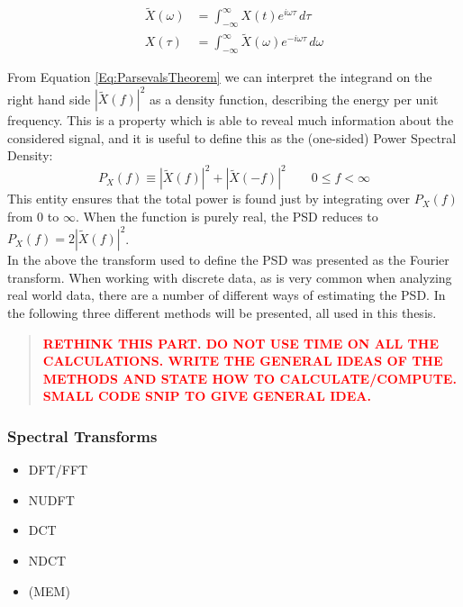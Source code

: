 \documentclass[../../CompleteThesis2/Complete_2ndDraft]{subfiles}
\begin{document}
\begin{equation}
	\begin{aligned}
		\tilde{X}(\omega) &= \int_{-\infty}^{\infty} X(t) e^{i\omega\tau}\, d\tau \\
		X(\tau) &= \int_{-\infty}^{\infty} \tilde{X}(\omega) e^{-i\omega\tau}\, d\omega
		\label{Eq:FourierTransformAngular}
	\end{aligned} 
\end{equation}

From Equation \ref{Eq:ParsevalsTheorem} we can interpret the integrand on the right hand side $|\tilde{X}(f)|^2$ as a density function, describing the energy per unit frequency. This is a property which is able to reveal much information about the considered signal, and it is useful to define this as the (one-sided) Power Spectral Density: 
\begin{equation}
	P_X(f) \equiv |\tilde{X}(f)|^2 + |\tilde{X}(-f)|^2 \qquad 0 \leq f < \infty
\end{equation}
This entity ensures that the total power is found just by integrating over $P_X(f)$ from 0 to $\infty$. When the function is purely real, the PSD reduces to $P_X(f) = 2|\tilde{X}(f)|^2$.\\
In the above the transform used to define the PSD was presented as the Fourier transform. When working with discrete data, as is very common when analyzing real world data, there are a number of different ways of estimating the PSD. In the following three different methods will be presented, all used in this thesis.
\newline
{}
\begin{quote}
	\textcolor{red}{\textbf{RETHINK THIS PART. DO NOT USE TIME ON ALL THE CALCULATIONS. WRITE THE GENERAL IDEAS OF THE METHODS AND STATE HOW TO CALCULATE/COMPUTE. SMALL CODE SNIP TO GIVE GENERAL IDEA.}}
\end{quote}


\subsubsection[Spectral Transforms][Spectral Transforms]{Spectral Transforms}
\label{Subsubsec:SignalAnalysis_BackDiffusion_SpectralAnalysis_SpectralTransforms}

\begin{itemize}
	\item DFT/FFT
	\item NUDFT
	\item DCT
	\item NDCT
	\item (MEM)
\end{itemize}
\end{document}
